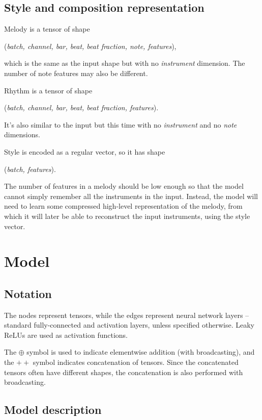 \documentclass[en]{pracamgr}
\begin{document}
\section{Style and composition representation}

Melody is a tensor of shape
\begin{center}
    (\emph{batch, channel, bar, beat, beat fraction, note, features}),
\end{center}
which is the same as the input shape but with no \emph{instrument} dimension.
The number of note features may also be different.

Rhythm is a tensor of shape
\begin{center}
    (\emph{batch, channel, bar, beat, beat fraction, features}).
\end{center}
It's also similar to the input but this time with no \emph{instrument} and no \emph{note} dimensions.

Style is encoded as a regular vector, so it has shape
\begin{center}
    (\emph{batch, features}).
\end{center}

The number of features in a melody should be low enough so that the model cannot simply remember all the instruments in the input.
Instead, the model will need to learn some compressed high-level representation of the melody, from which it will later be able to reconstruct the input instruments, using the style vector.

\chapter{Model}

\section{Notation}

The nodes represent tensors, while the edges represent neural network layers -- standard fully-connected and activation layers, unless specified otherwise.
Leaky ReLUs are used as activation functions.

The $\oplus$ symbol is used to indicate elementwise addition (with broadcasting), and the $++$ symbol indicates concatenation of tensors.
Since the concatenated tensors often have different shapes, the concatenation is also performed with broadcasting.

\section{Model description}
\end{document}
